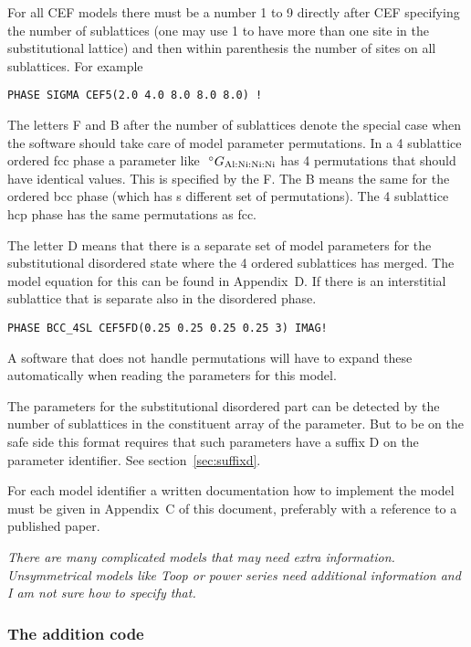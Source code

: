 \documentclass[12pt]{article}
\begin{document}
For all CEF models there must be a number 1 to 9 directly after CEF
specifying the number of sublattices (one may use 1 to have more than
one site in the substitutional lattice) and then within parenthesis
the number of sites on all sublattices.  For example

\begin{verbatim}
PHASE SIGMA CEF5(2.0 4.0 8.0 8.0 8.0) !
\end{verbatim}

The letters F and B after the number of sublattices denote the special
case when the software should take care of model parameter
permutations.  In a 4 sublattice ordered fcc phase a parameter like
$~^{\circ}G_{\rm Al:Ni:Ni:Ni}$ has 4 permutations that should have
identical values.  This is specified by the F.  The B means the same
for the ordered bcc phase (which has s different set of permutations).
The 4 sublattice hcp phase has the same permutations as fcc.

The letter D means that there is a separate set of model parameters
for the substitutional disordered state where the 4 ordered sublattices
has merged.  The model equation for this can be found in Appendix~D.
If there is an interstitial sublattice that is separate also in the
disordered phase.

\begin{verbatim}
PHASE BCC_4SL CEF5FD(0.25 0.25 0.25 0.25 3) IMAG!
\end{verbatim}

A software that does not handle permutations will have to expand these
automatically when reading the parameters for this model.

The parameters for the substitutional disordered part can be detected
by the number of sublattices in the constituent array of the
parameter.  But to be on the safe side this format requires that such
parameters have a suffix D on the parameter identifier.  See
section~\ref{sec:suffixd}.

For each model identifier a written documentation how to implement the
model must be given in Appendix~C of this document, preferably with a
reference to a published paper.

{\em There are many complicated models that may need extra
  information.  Unsymmetrical models like Toop or power series need
  additional information and I am not sure how to specify that.}


\subsubsection{The addition code}
\end{document}
